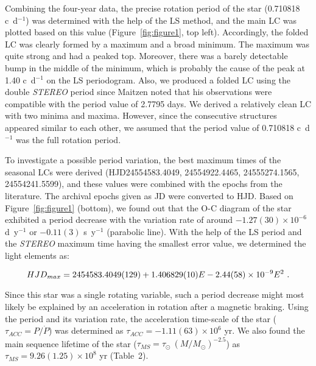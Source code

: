 \documentclass[]{article}
\begin{document}
Combining the four-year data, the precise rotation period of the star (0.710818 c~d$^{-1}$) was determined with the help of the LS method, and the main LC was plotted based on this value (Figure~\ref{fig:figure1}, top left). Accordingly, the folded LC was clearly formed by a maximum and a broad minimum. The maximum was quite strong and had a peaked top. Moreover, there was a barely detectable bump in the middle of the minimum, which is probably the cause of the peak at 1.40 c~d$^{-1}$ on the LS periodogram. Also, we produced a folded LC using the double {\sl STEREO} period since Maitzen \cite{bib6} noted that his observations were compatible with the period value of 2.7795 days. We derived a relatively clean LC with two minima and maxima. However, since the consecutive structures appeared similar to each other, we assumed that the period value of 0.710818 c~d$^{-1}$ was the full rotation period.

To investigate a possible period variation, the best maximum times of the seasonal LCs were derived (HJD24554583.4049, 24554922.4465, 24555274.1565, 24554241.5599), and these values were combined with the epochs from the literature. The archival epochs given as JD were converted to HJD. Based on Figure~\ref{fig:figure1} (bottom), we found out that the O-C diagram of the star exhibited a period decrease with the variation rate of around $-1.27(30) \times 10^{-6}$ d~y$^{-1}$ or $-0.11(3)$ s~y$^{-1}$ (parabolic line). With the help of the LS period and the {\sl STEREO} maximum time having the smallest error value, we determined the light elements as:   

\begin{equation}
\nonumber \\
HJD_{max} = 2454583.4049(129)+ 1.406829(10) E - 2.44(58) \times 10^{-9} E^2 ~.
\end{equation}

Since this star was a single rotating variable, such a period decrease might most likely be explained by an acceleration in rotation after a magnetic braking. Using the period and its variation rate, the acceleration time-scale of the star ($\tau_{ACC} = P/\dot{P}$) was determined as $\tau_{ACC} = -1.11(63) \times 10^{6}$ yr. We also found the main sequence lifetime of the star ($\tau_{MS} = \tau_{\odot}~(M/M_{\odot})^{-2.5}$) as $\tau_{MS} = 9.26(1.25) \times 10^{8}$ yr (Table~2).
\end{document}
